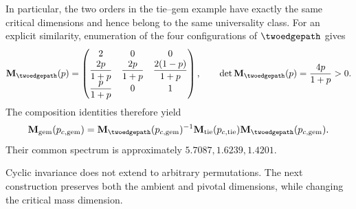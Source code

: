 \documentclass[scheme=plain,11pt]{ctexart}
\theoremstyle{definition}
\theoremstyle{remark}
\begin{document}
In particular, the two orders in the tie--gem example have exactly the same critical dimensions and hence belong to the same universality class.
For an explicit similarity, enumeration of the four configurations of $\twoedgepath$ gives
\[
 \mathbf M_{\twoedgepath}(p)=
 \begin{pmatrix}
 2&0&0\\
 \dfrac{2p}{1+p}&\dfrac{2p}{1+p}&\dfrac{2(1-p)}{1+p}\\[3pt]
 \dfrac{p}{1+p}&0&1
 \end{pmatrix},
 \qquad \det\mathbf M_{\twoedgepath}(p)=\frac{4p}{1+p}>0.
\]
The composition identities therefore yield
\[
 \mathbf M_{\mathrm{gem}}(p_{c,\mathrm{gem}})
 =\mathbf M_{\twoedgepath}(p_{c,\mathrm{gem}})^{-1}
 \mathbf M_{\mathrm{tie}}(p_{c,\mathrm{tie}})
 \mathbf M_{\twoedgepath}(p_{c,\mathrm{gem}}).
\]
Their common spectrum is approximately $5.7087,1.6239,1.4201$.

Cyclic invariance does not extend to arbitrary permutations.
The next construction preserves both the ambient and pivotal dimensions, while changing the critical mass dimension.
\end{document}
